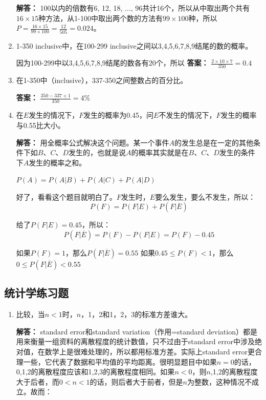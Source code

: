 \documentclass[12pt]{article}
\begin{document}
\begin{CJK*}{UTF8}{gbsn}
\begin{enumerate}
    \textbf{解答：} 100以内的倍数有6, 12, 18, ..., 96共计16个，所以从中取出两个共有$16 \times 15$种方法，从1-100中取出两个数的方法有$99 \times 100$种，所以$P = \frac{16 \times 15}{99 \times 100} = \frac{12}{505} = 0.024$。
    
    \item 1-350 inclusive中，在100-299 inclusive之间以3,4,5,6,7,8,9结尾的数的概率。
    
    因为100-299中以3,4,5,6,7,8,9结尾的数各有20个，所以
    \textbf{答案：} $\frac{2 \times 10 \times 7}{350} = 0.4$
    
    \item 在1-350中（inclusive），337-350之间整数占的百分比。
    
    \textbf{答案：} $\frac{350-337+1}{350} = 4\%$
    
    \item 在$E$发生的情况下，$F$发生的概率为0.45，问$E$不发生的情况下，$F$发生的概率与0.55比大小。
    
    \textbf{解答：} 用全概率公式解决这个问题。某一个事件$A$的发生总是在一定的其他条件下如$B$、$C$、$D$发生的，也就是说$A$的概率其实就是在$B$、$C$、$D$发生的条件下$A$发生的概率之和。
    
    $P(A) = P(A|B) + P(A|C) + P(A|D)$
    
    好了，看看这个题目就明白了。$F$发生时，$E$要么发生，要么不发生，所以：
    $$P(F) = P(F|E) + P(F|\overline{E})$$
    
    给了$P(F|E) = 0.45$，所以：
    $$P(F|\overline{E}) = P(F) - P(F|E) = P(F) - 0.45$$
    
    如果$P(F) = 1$，那么$P(F|\overline{E}) = 0.55$
    如果$0.45 \leq P(F) < 1$，那么$0 \leq P(F|\overline{E}) < 0.55$
\end{enumerate}

\subsection{统计学练习题}
\begin{enumerate}
    \item 比较，当$n < 1$时，$n$，1，2和1，2，3的标准方差谁大。
    
    \textbf{解答：} standard error和standard variation（作用=standard deviation）都是用来衡量一组资料的离散程度的统计数值，只不过由于standard error中涉及绝对值，在数学上是很难处理的，所以都用标准方差。实际上standard error更合理一些，它代表了数据和平均值的平均距离。很明显题目中如果$n=0$的话，0,1,2的离散程度应该和1,2,3的离散程度相同。如果$n<0$，则$n$,1,2的离散程度大于后者，而$0<n<1$的话，则后者大于前者，但是$n$为整数，这种情况不成立。故而：
    

\end{enumerate}
\end{CJK*}
\end{document}
